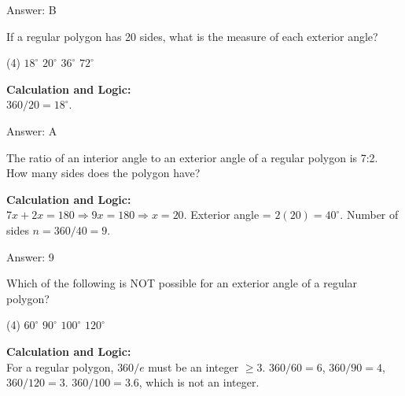 \documentclass[11pt,paper=a4,answers]{exam}
\begin{document}
\begin{questions}
\begin{solution}
\vspace{30pt}

Answer: \colorbox{yellow!100}{B}
\end{solution}

\vspace{60pt}

\question
If a regular polygon has 20 sides, what is the measure of each exterior angle?
\begin{tasks}(4)
    \task $18^\circ$
    \task $20^\circ$
    \task $36^\circ$
    \task $72^\circ$
\end{tasks}

\begin{solution}
\textbf{Calculation and Logic:} \\
$360 / 20 = 18^\circ$.

\vspace{30pt}

Answer: \colorbox{yellow!100}{A}
\end{solution}

\vspace{60pt}

\question
The ratio of an interior angle to an exterior angle of a regular polygon is 7:2. How many sides does the polygon have?

\begin{solution}
\textbf{Calculation and Logic:} \\
$7x + 2x = 180 \Rightarrow 9x = 180 \Rightarrow x = 20$. Exterior angle = $2(20) = 40^\circ$. Number of sides $n = 360 / 40 = 9$.

\vspace{30pt}

Answer: \colorbox{yellow!100}{9}
\end{solution}

\vspace{60pt}

\question
Which of the following is NOT possible for an exterior angle of a regular polygon?
\begin{tasks}(4)
    \task $60^\circ$
    \task $90^\circ$
    \task $100^\circ$
    \task $120^\circ$
\end{tasks}

\begin{solution}
\textbf{Calculation and Logic:} \\
For a regular polygon, $360/e$ must be an integer $\ge 3$. $360/60=6$, $360/90=4$, $360/120=3$. $360/100 = 3.6$, which is not an integer.


\end{solution}
\end{questions}
\end{document}
